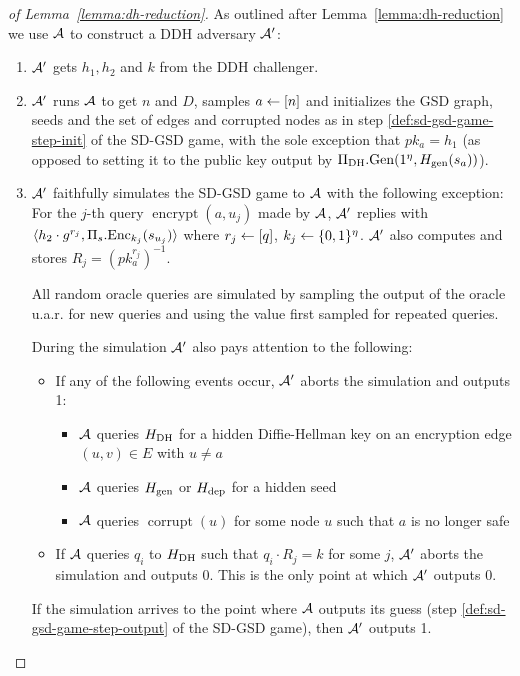 \begin{proof}[of Lemma~\ref{lemma:dh-reduction}]
	As outlined after Lemma~\ref{lemma:dh-reduction} we use $\mathcal{A}$ to construct a DDH adversary $\mathcal{A}'$:
	\begin{enumerate}[1.]
		\item $\mathcal{A}'$ gets $h_1, h_2$ and $k$ from the DDH challenger.
		\item $\mathcal{A}'$ runs $\mathcal{A}$ to get $n$ and $D$, samples $a \leftarrow [n]$ and initializes the GSD graph, seeds and the set of edges and corrupted nodes as in step \ref{def:sd-gsd-game-step-init} of the SD-GSD game, with the sole exception that $pk_a = h_1$ (as opposed to setting it to the public key output by $\Pi_{\mathrm{DH}}.\mathrm{Gen}(1^\eta, H_\mathrm{gen}(s_a))$).
		\item $\mathcal{A}'$ faithfully simulates the SD-GSD game to $\mathcal{A}$ with the following exception: For the $j$-th query $\operatorname{encrypt}(a, u_j)$ made by $\mathcal{A}$, $\mathcal{A}'$ replies with $\langle h_2 \cdot g^{r_j}, \Pi_s.\mathrm{Enc}_{k_j}(s_{u_j}) \rangle$ where $r_j \leftarrow [q]$, $k_j \leftarrow \{0, 1\}^\eta$. $\mathcal{A}'$ also computes and stores $R_j = \left(pk_a^{r_j}\right)^{-1}$.

		      All random oracle queries are simulated by sampling the output of the oracle u.a.r. for new queries and using the value first sampled for repeated queries.

		      During the simulation $\mathcal{A}'$ also pays attention to the following:
		      \begin{itemize}
			      \item If any of the following events occur, $\mathcal{A}'$ aborts the simulation and outputs 1:
			            \begin{itemize}
				            \item $\mathcal{A}$ queries $H_\mathrm{DH}$ for a hidden Diffie-Hellman key on an encryption edge $(u, v) \in E$ with $u \neq a$
				            \item $\mathcal{A}$ queries $H_\mathrm{gen}$ or $H_\mathrm{dep}$ for a hidden seed
				            \item $\mathcal{A}$ queries $\operatorname{corrupt}(u)$ for some node $u$ such that $a$ is no longer safe
			            \end{itemize}
			      \item If $\mathcal{A}$ queries $q_i$ to $H_\mathrm{DH}$ such that $q_i \cdot R_j = k$ for some $j$, $\mathcal{A}'$ aborts the simulation and outputs 0. This is the only point at which $\mathcal{A}'$ outputs 0.
		      \end{itemize}

		      If the simulation arrives to the point where $\mathcal{A}$ outputs its guess (step \ref{def:sd-gsd-game-step-output} of the SD-GSD game), then $\mathcal{A}'$ outputs 1.
	\end{enumerate}


\end{proof}
